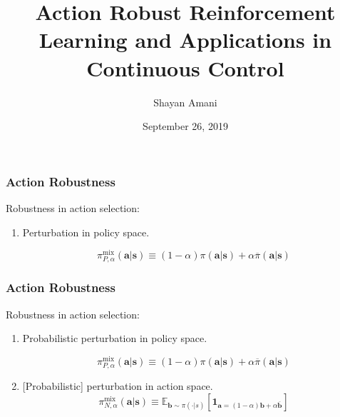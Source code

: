 \documentclass{beamer}
\title{Action Robust Reinforcement Learning and Applications in Continuous Control}
\author{Shayan Amani}
\date{September 26, 2019}
\institute{Department of Computer Science, University of New Hampshire}
\begin{document}
  \begin{frame}
    \titlepage
  \end{frame}

\begin{frame}
    \frametitle{Action Robustness}
        Robustness in action selection:
            \begin{enumerate}
                \item Perturbation in policy space.
        
        \begin{equation} \tag{1}
            \pi_{P, \alpha}^{\operatorname{mix}}(\mathbf{a} |\mathbf{s}) \equiv(1-\alpha) \pi(\mathbf{a} | \mathbf{s})+\alpha \overline{\pi}(\mathbf{a} | \mathbf{s})
        \end{equation}
             \end{enumerate}
\end{frame}

\begin{frame}
    \frametitle{Action Robustness}
        Robustness in action selection:
            \begin{enumerate}
                \item Probabilistic perturbation in policy space.
        
                    \begin{equation} \tag{1}
                        \pi_{P, \alpha}^{\operatorname{mix}}(\mathbf{a} |\mathbf{s}) \equiv(1-\alpha) \pi(\mathbf{a} | \mathbf{s})+\alpha \overline{\pi}(\mathbf{a} | \mathbf{s})
                    \end{equation}
        
                \item {[Probabilistic]} perturbation in action space.
                    \begin{equation} \tag{2}
                        \pi_{N, \alpha}^{\operatorname{mix}}(\mathbf{a} | \mathbf{s}) \equiv \mathbb{E}_{\mathbf{b} \sim \pi(\cdot | s)}\left[\mathbf{1}_{\mathbf{a}=(1-\alpha) \mathbf{b}+\alpha \overline{\mathbf{b}}}\right]
                    \end{equation}
        
             \end{enumerate}
\end{frame}
\end{document}
